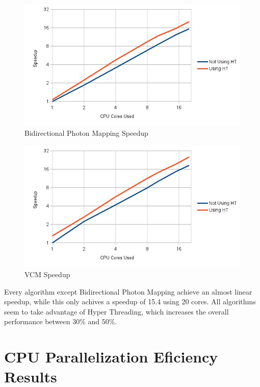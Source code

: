 \begin{figure}[H]
\includegraphics[width=\linewidth]{img/bpmSpeedup.jpg}
\caption{\label{img:bpmSpeedup} Bidirectional Photon Mapping Speedup}
\end{figure}

\begin{figure}[H]
\includegraphics[width=\linewidth]{img/vcmSpeedup.jpg}
\caption{\label{img:vcmSpeedup} VCM Speedup}
\end{figure}

Every algorithm except Bidirectional Photon Mapping achieve an almost linear speedup, while this only achives a speedup of 15.4 using 20 cores. All algorithms seem to take advantage of Hyper Threading, which increases the overall performance between 30\% and 50\%.

\section{CPU Parallelization Eficiency Results}


